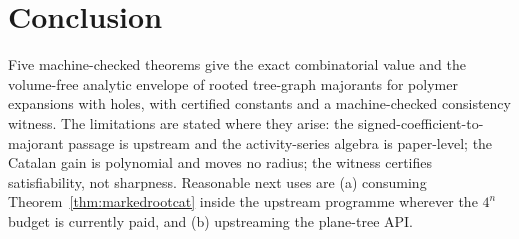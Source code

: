 \documentclass[11pt]{article}
\begin{document}
\section{Conclusion}

Five machine-checked theorems give the exact combinatorial value and
the volume-free analytic envelope of rooted tree-graph majorants for
polymer expansions with holes, with certified constants and a
machine-checked consistency witness.  The limitations are stated
where they arise: the signed-coefficient-to-majorant passage is
upstream and the activity-series algebra is paper-level; the
Catalan gain is polynomial and moves no radius; the witness certifies
satisfiability, not sharpness.  Reasonable next uses are (a)
consuming Theorem~\ref{thm:markedrootcat} inside the upstream
programme wherever the $4^n$ budget is currently paid, and (b)
upstreaming the plane-tree API.
\end{document}
